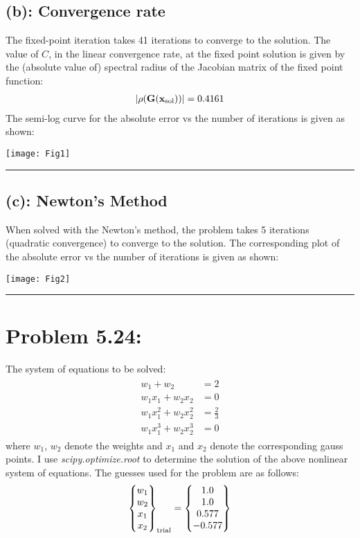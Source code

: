 \subsection*{(b): Convergence rate}
The fixed-point iteration takes 41 iterations to converge to the solution. The value of $C$, in the linear convergence rate, at the fixed point solution is given by the (absolute value of) spectral radius of the Jacobian matrix of the fixed point function: 
\begin{align*}
|\rho({\bf G(x_{\rm sol})})| = 0.4161
\end{align*}
The semi-log curve for the absolute error vs the number of iterations is given as shown:
\begin{center}
\texttt{[image: Fig1]}
\end{center} \hrule \newpage
\subsection*{(c): Newton's Method}
When solved with the Newton's method, the problem takes 5 iterations (quadratic convergence) to converge to the solution. The corresponding plot of the absolute error vs the number of iterations is given as shown:
\begin{center}
\texttt{[image: Fig2]}
\end{center} \hrule
\newpage\section*{Problem 5.24:}
The system of equations to be solved: 
\begin{align}
\begin{split}
w_1 + w_2 & = 2 \\
w_1x_1 + w_2x_2 & = 0 \\
w_1x^2_1+w_2x^2_2 & = \frac{2}{3} \\
w_1x^3_1+w_2x^3_2 & = 0
\end{split}
\label{524}
\end{align}
where $w_1$, $w_2$ denote the weights and $x_1$ and $x_2$ denote the corresponding gauss points. I use \emph{scipy.optimize.root} to determine the solution of the above nonlinear system of equations. The guesses used for the problem are as follows: 
\begin{align*}
\begin{Bmatrix}
w_1\\w_2\\x_1\\x_2
\end{Bmatrix}_{\rm trial}
=
\begin{Bmatrix}
1.0\\1.0\\0.577\\-0.577
\end{Bmatrix}
\end{align*}
